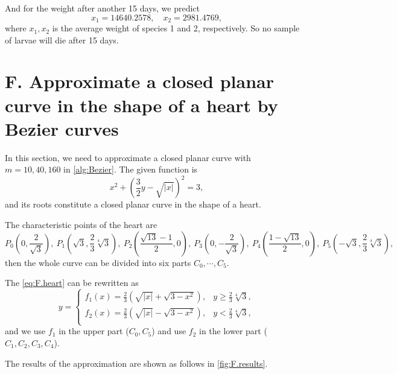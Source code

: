 \documentclass[a4paper]{article}
\begin{document}
And for the weight after another 15 days, we predict
\begin{equation}
    x_1 = 14640.2578, \quad x_2 = 2981.4769,
    \label{eq:E.predict}
\end{equation}
where $x_1, x_2$ is the average weight of species 1 and 2, respectively. So no sample of larvae will die after 15 days.

\section*{F. Approximate a closed planar curve in the shape of a heart by Bezier curves}

In this section, we need to approximate a closed planar curve with $m = 10, 40, 160$ in \cref{alg:Bezier}.
The given function is 
\begin{equation}
    x^2 + (\frac{3}{2}y - \sqrt{|x|})^2 = 3,
    \label{eq:F.heart}
\end{equation}
and its roots constitute a closed planar curve in the shape of a heart.

The characteristic points of the heart are 
\begin{equation}
    P_0(0, \frac{2}{\sqrt{3}}),\ P_1(\sqrt{3}, \frac{2}{3} \sqrt[4]{3}),\ P_2(\frac{\sqrt{13} - 1}{2}, 0),\ P_3(0, -\frac{2}{\sqrt{3}}),\ P_4(\frac{1 - \sqrt{13}}{2}, 0),\ P_5(-\sqrt{3}, \frac{2}{3} \sqrt[4]{3}),
    \label{eq:F.heart_points}
\end{equation}
then the whole curve can be divided into six parts $C_0, \cdots, C_5$.

The \cref{eq:F.heart} can be rewritten as 
\begin{equation}
    y = 
    \begin{cases}
        f_1(x) = \frac{2}{3} (\sqrt{|x|} + \sqrt{3 - x^2}), & y \geqslant \frac{2}{3} \sqrt[4]{3}, \\
        f_2(x) = \frac{2}{3} (\sqrt{|x|} - \sqrt{3 - x^2}), & y < \frac{2}{3} \sqrt[4]{3}, \\
    \end{cases}
    \label{eq:F.heart_rewrite}
\end{equation}
and we use $f_1$ in the upper part ($C_0, C_5$) and use $f_2$ in the lower part ($C_1, C_2, C_3, C_4$).

The results of the approximation are shown as follows in \cref{fig:F.results}.
\end{document}
